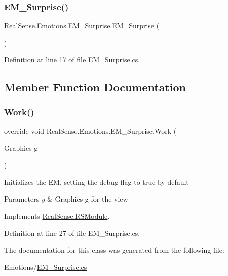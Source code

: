 \subsubsection{\texorpdfstring{E\+M\+\_\+\+Surprise()}{EM\_Surprise()}}
{\footnotesize\ttfamily Real\+Sense.\+Emotions.\+E\+M\+\_\+\+Surprise.\+E\+M\+\_\+\+Surprise (\begin{DoxyParamCaption}{ }\end{DoxyParamCaption})}



Definition at line 17 of file E\+M\+\_\+\+Surprise.\+cs.



\subsection{Member Function Documentation}
\mbox{\label{class_real_sense_1_1_emotions_1_1_e_m___surprise_a08040934bb081596a4b02b483dc3a662}} 
\subsubsection{\texorpdfstring{Work()}{Work()}}
{\footnotesize\ttfamily override void Real\+Sense.\+Emotions.\+E\+M\+\_\+\+Surprise.\+Work (\begin{DoxyParamCaption}\item[{Graphics}]{g }\end{DoxyParamCaption})\hspace{0.3cm}{\ttfamily [virtual]}}

Initializes the EM, setting the debug-\/flag to true by default 
\begin{DoxyParams}{Parameters}
{\em g} & Graphics g for the view \\
\hline
\end{DoxyParams}


Implements \hyperlink{class_real_sense_1_1_r_s_module_a2ec830b7932ee7c0077d473f81c73867}{Real\+Sense.\+R\+S\+Module}.



Definition at line 27 of file E\+M\+\_\+\+Surprise.\+cs.



The documentation for this class was generated from the following file\+:\begin{DoxyCompactItemize}
\item 
Emotions/\hyperlink{_e_m___surprise_8cs}{E\+M\+\_\+\+Surprise.\+cs}\end{DoxyCompactItemize}
